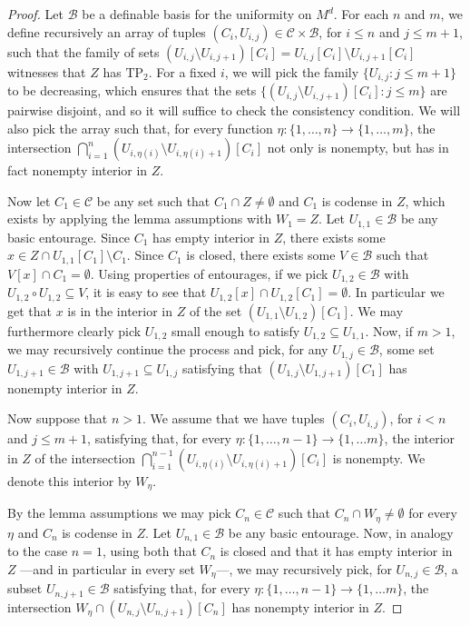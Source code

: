 \documentclass[12pt]{article}
\newcommand{\Bb}{\mathcal{B}}
\newcommand{\Cc}{\mathcal{C}}
\newcommand{\BU}{\Bb} %
\newcommand{\TP}{\ensuremath{\mathrm{TP}_2}}
\theoremstyle{definition}
\theoremstyle{remark}
\begin{document}
\begin{proof}
Let $\BU$ be a definable basis for the uniformity on $M^d$. 
For each $n$ and $m$, we define recursively an array of tuples $(C_{i}, U_{i,j}) \in \Cc\times\BU$, for $i\leq n$ and $j\leq m+1$, such that the family of sets $(U_{i,j}\setminus U_{i,j+1})[C_i] = U_{i,j}[C_i]\setminus U_{i,j+1}[C_i]$ witnesses that $Z$ has \TP. For a fixed $i$, we will pick the family $\{ U_{i,j} : j\leq m+1\}$ to be decreasing, which ensures that the sets $\{(U_{i,j}\setminus U_{i,j+1})[C_i] : j \leq m\}$ are pairwise disjoint, and so it will suffice to check the consistency condition. We will also pick the array such that, for every function $\eta:\{1,\ldots, n\}\rightarrow \{1,\ldots, m\}$, the intersection $\bigcap_{i=1}^{n} (U_{i,\eta(i)}\setminus U_{i,\eta(i)+1})[C_i]$ not only is nonempty, but has in fact nonempty interior in $Z$. 

Now let $C_1\in \Cc$ be any set such that $C_1\cap Z \neq \emptyset$ and $C_1$ is codense in $Z$, which exists by applying the lemma assumptions with $W_1=Z$. Let $U_{1,1}\in \BU$ be any basic entourage. Since $C_1$ has empty interior in $Z$, there exists some $x\in Z \cap U_{1,1}[C_1]\setminus C_1$. Since $C_1$ is closed, there exists some $V\in \BU$ such that  $V[x] \cap C_1 = \emptyset$. Using properties of entourages, if we pick $U_{1,2}\in \BU$ with $U_{1,2} \circ U_{1,2}\subseteq V$, it is easy to see that $U_{1,2}[x] \cap U_{1,2}[C_1] = \emptyset$. In particular we get that $x$ is in the interior in $Z$ of the set $(U_{1,1}\setminus U_{1,2})[C_1]$. We may furthermore clearly pick $U_{1,2}$ small enough to satisfy $U_{1,2}\subseteq U_{1,1}$. Now, if $m>1$, we may recursively continue the process and pick, for any $U_{1,j} \in \BU$, some set $U_{1,j+1}\in \BU$ with $U_{1,j+1}\subseteq U_{1,j}$ satisfying that $(U_{1,j}\setminus U_{1,j+1})[C_1]$ has nonempty interior in $Z$. 

Now suppose that $n>1$. We assume that we have tuples $(C_{i}, U_{i,j})$, for $i<n$ and $j\leq m+1$, satisfying that, for every $\eta: \{1,\ldots, n-1\} \rightarrow \{1,\ldots m\}$, the interior in $Z$ of the intersection 
$
\bigcap_{i=1}^{n-1} (U_{i,\eta(i)}\setminus U_{i,\eta(i)+1})[C_i] 
$
is nonempty. We denote this interior by $W_\eta$. 

By the lemma assumptions we may pick $C_{n}\in \Cc$ such that $C_n\cap W_{\eta} \neq \emptyset$ for every $\eta$ and $C_n$ is codense in $Z$. Let $U_{n,1}\in \BU$ be any basic entourage. Now, in analogy to the case $n=1$, using both that $C_n$ is closed and that it has empty interior in $Z$ ---and in particular in every set $W_\eta$---, we may recursively pick, for $U_{n,j}\in \BU$, a subset $U_{n,j+1}\in \BU$ satisfying that, for every $\eta: \{1,\ldots, n-1\} \rightarrow \{1,\ldots m\}$, the intersection $W_{\eta} \cap (U_{n,j}\setminus U_{n,j+1})[C_n]$ has nonempty interior in $Z$. 
\end{proof}
\end{document}
